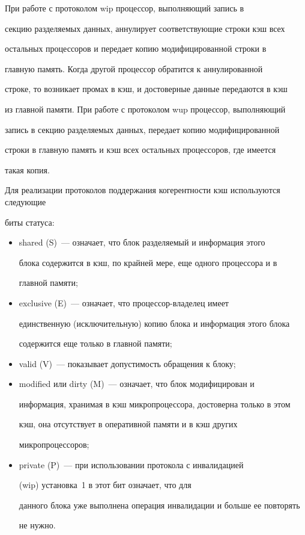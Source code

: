       При работе с протоколом wip процессор, выполняющий запись в 


секцию  разделяемых данных, аннулирует соответствующие строки кэш всех 


остальных процессоров и передает  копию модифицированной строки в 


главную память. Когда другой процессор обратится к аннулированной 


строке, то возникает промах в кэш, и достоверные данные передаются в кэш 


из главной памяти. При работе с протоколом wup процессор, вы\-пол\-ня\-ющий 


запись в секцию  разделяемых данных, передает копию модифицированной 


строки в главную память и кэш всех  остальных процессоров, где имеется 


такая копия.





Для реализации протоколов поддержания когерентности  кэш используются следующие 


биты статуса: 


\begin{itemize}


\item     shared (S)~--- означает, что блок разделяемый и информация этого 


блока содержится в кэш, по крайней мере, еще одного процессора и  в 


главной памяти;


     \item


     exclusive (E)~--- означает, что про\-цес\-сор-вла\-де\-лец имеет 


единственную (исключительную) копию блока и информация этого блока 


содержится  еще только в главной памяти;


     \item


     valid (V)~--- показывает допустимость обращения к блоку;


     \item


     modified или dirty (M)~--- означает, что блок модифицирован и 


информация, хранимая в кэш микропроцессора, достоверна только в этом 


кэш, она отсутствует в оперативной памяти и в кэш других 


микропроцессоров;


     \item


     private (P)~--- при использовании протокола с инвалидацией 


     (wip) установка~1 в этот бит означает, что для 


данного блока уже выполнена операция инвалидации и больше ее повторять 


не нужно.


\end{itemize}


